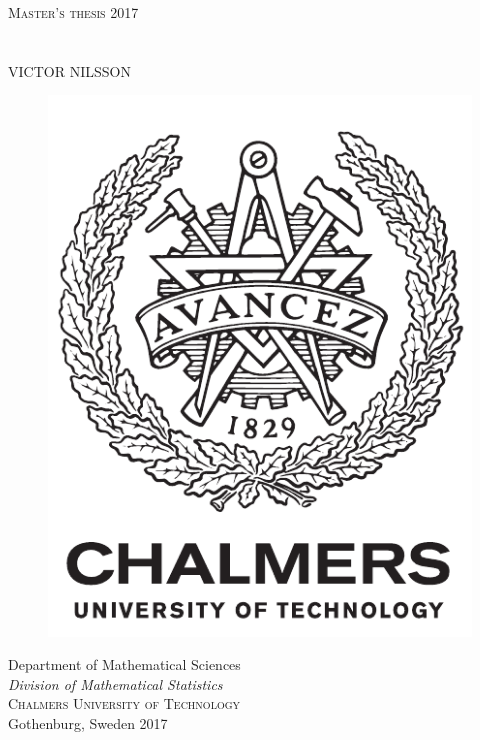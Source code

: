 \newpage
\thispagestyle{empty}
\begin{center}
	\textsc{\large Master's thesis 2017}\\[4cm]		%
	\textbf{\Large \titlename} \\[1cm]
	{\large \subtitlename}\\[1cm]
	{\large VICTOR NILSSON}

	\vfill
	\begin{figure}[H]
	\centering
	\includegraphics[width=0.2\pdfpagewidth]{figure/auxiliary/logo_eng.pdf} \\
	\end{figure}	\vspace{5mm}

	Department of Mathematical Sciences \\
	\emph{Division of Mathematical Statistics}\\
	\textsc{Chalmers University of Technology} \\
	Gothenburg, Sweden 2017 \\
\end{center}


